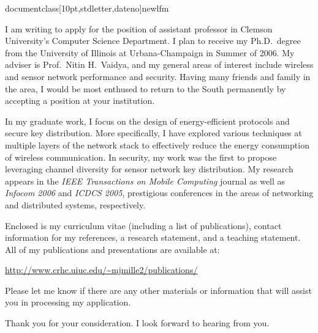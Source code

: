 documentclass[10pt,stdletter,dateno]{newlfm}
\usepackage{kpfonts}
\usepackage{url}






\begin{newlfm}

I am writing to apply for the position of assistant
professor in Clemson University's Computer Science Department.  I plan to receive my
Ph.D.\ degree from the University of Illinois at
Urbana-Champaign in Summer of 2006.  My adviser is
Prof.\ Nitin H.\ Vaidya, and my general areas of interest
include wireless and sensor network performance and security.
 Having many friends and family in the area, I would be
most enthused to return to the South permanently by accepting
a position at your institution.

In my graduate work, I focus on the design of
energy-efficient protocols and secure key distribution.
More specifically, I have explored various techniques at
multiple layers of the network stack to effectively reduce
the energy consumption of wireless communication.  In security,
my work was the first to propose leveraging channel diversity
for sensor network key distribution.  My research appears in 
the \textit{IEEE Transactions on Mobile Computing} journal as
well as \textit{Infocom 2006} and \textit{ICDCS 2005},
prestigious conferences in the areas of networking and distributed
systems, respectively.

Enclosed is my curriculum vitae (including a list of
publications), contact information for my references, a research
statement, and a teaching statement.  All of my publications and
presentations are available at:

\url{http://www.crhc.uiuc.edu/~mjmille2/publications/}

Please let me know if there are any other materials
or information that will assist you in processing my application.

Thank you for your consideration.  I look forward to
hearing from you.

\end{newlfm}
